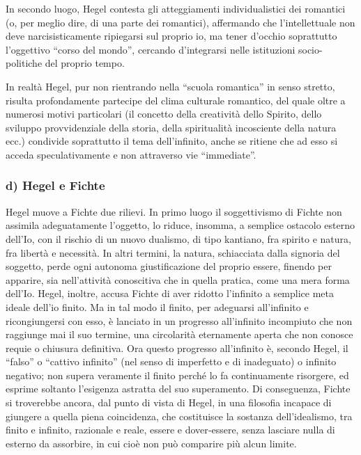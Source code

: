 \documentclass[a4paper,12pt,oneside,openany]{book}%
\begin{document}
In secondo luogo, Hegel contesta gli atteggiamenti individualistici dei romantici (o, per meglio dire, di una parte dei romantici), affermando che l’intellettuale non deve narcisisticamente ripiegarsi sul proprio io, ma tener d’occhio soprattutto l’oggettivo “corso del mondo”, cercando d’integrarsi nelle istituzioni socio-politiche del proprio tempo.

In realtà Hegel, pur non rientrando nella “scuola romantica” in senso stretto, risulta profondamente partecipe del clima culturale romantico, del quale oltre a numerosi motivi particolari (il concetto della creatività dello Spirito, dello sviluppo provvidenziale della storia, della spiritualità incosciente della natura ecc.) condivide soprattutto il tema dell’infinito, anche se ritiene che ad esso si acceda speculativamente e non attraverso vie “immediate”.

\subsubsection*{d) Hegel e Fichte}

Hegel muove a Fichte due rilievi. In primo luogo il soggettivismo di Fichte non assimila adeguatamente l’oggetto, lo riduce, insomma, a semplice ostacolo esterno dell’Io, con il rischio di un nuovo dualismo, di tipo kantiano, fra spirito e natura, fra libertà e necessità. In altri termini, la natura, schiacciata dalla signoria del soggetto, perde ogni autonoma giustificazione del proprio essere, finendo per apparire, sia nell’attività conoscitiva che in quella pratica, come una mera forma dell’Io.
Hegel, inoltre, accusa Fichte di aver ridotto l’infinito a semplice meta ideale dell’io finito. Ma in tal modo il finito, per adeguarsi all’infinito e ricongiungersi con esso, è lanciato in un progresso all’infinito incompiuto che non raggiunge mai il suo termine, una circolarità eternamente aperta che non conosce requie o chiusura definitiva. Ora questo progresso all’infinito è, secondo Hegel, il “falso” o “cattivo infinito” (nel senso di imperfetto e di inadeguato) o infinito negativo; non supera veramente il finito perché lo fa continuamente risorgere, ed esprime soltanto l’esigenza astratta del suo superamento. Di conseguenza, Fichte si troverebbe ancora, dal punto di vista di Hegel, in una filosofia incapace di giungere a quella piena coincidenza, che costituisce la sostanza dell’idealismo, tra finito e infinito, razio­nale e reale, essere e dover‑essere, senza lasciare nulla di esterno da assorbire, in cui cioè non può comparire più alcun limite.
\end{document}

